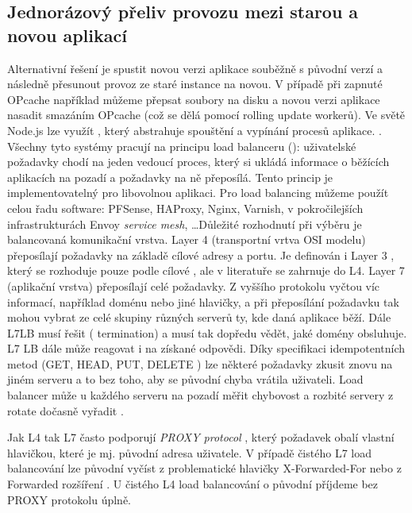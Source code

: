         \subsection{Jednorázový přeliv provozu mezi starou a novou aplikací}
            \label{deploy-v-jedne-instanci}
            Alternativní řešení je spustit novou verzi aplikace souběžně s původní verzí a následně přesunout provoz ze staré instance na novou. V případě  při zapnuté OPcache například můžeme přepsat soubory na disku a novou verzi aplikace nasadit smazáním OPcache (což se dělá pomocí rolling update  workerů). Ve světě Node.js lze využít , který abstrahuje spouštění a vypínání procesů aplikace. . Všechny tyto systémy pracují na principu load balanceru (): uživatelské požadavky chodí na jeden vedoucí proces, který si ukládá informace o běžících aplikacích na pozadí a požadavky na ně přeposílá. Tento princip je implementovatelný pro libovolnou aplikaci. Pro load balancing můžeme použít celou řadu software: PFSense, HAProxy, Nginx, Varnish, v pokročilejších infrastrukturách Envoy \textit{service mesh}, \ldots Důležité rozhodnutí při výběru  je balancovaná komunikační vrstva. Layer 4 (transportní vrtva OSI modelu)  přeposílají  požadavky na základě cílové  adresy a portu. Je definován i Layer 3 , který se rozhoduje pouze podle cílové , ale v literatuře se zahrnuje do L4. Layer 7 (aplikační vrstva)  přeposílají celé \HTTP požadavky. Z vyššího protokolu vyčtou víc informací, například doménu nebo jiné hlavičky, a při přeposílání požadavku tak mohou vybrat ze celé skupiny různých serverů ty, kde daná aplikace běží. Dále L7LB musí řešit  ( termination) a musí tak dopředu vědět, jaké domény obsluhuje. L7 LB dále může reagovat i na získané \HTTP odpovědi. Díky \HTTP specifikaci idempotentních metod (GET, HEAD, PUT, DELETE \cite{http-idempotent}) lze některé požadavky zkusit znovu na jiném serveru a to bez toho, aby se původní chyba vrátila uživateli. Load balancer může u každého serveru na pozadí měřit chybovost a rozbité servery z rotate dočasně vyřadit .

            Jak L4 tak L7  často podporují \textit{PROXY protocol} \cite{tarreau-proxyprotocol}, který požadavek obalí vlastní hlavičkou, které je mj. původní  adresa uživatele. V případě čistého L7 load balancování lze původní  vyčíst z problematické \cite{hansen-xforwardedfor} hlavičky X-Forwarded-For nebo z Forwarded rozšíření \cite{http-forwarded}. U čistého L4 load balancování o původní  příjdeme bez PROXY protokolu úplně.

